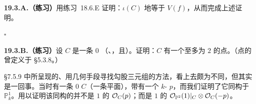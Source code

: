 \textbf{19.3.A.（练习）}\quad 用\mbox{练习~18.6.E} 证明：$\iota(C)$ \trSchemeTheoretic{}地等于 $V(f)$，从而完成上述证明。

\begin{flushright}
$\square$
\end{flushright}

\textbf{19.3.B.（练习）}\quad 设 $C$ 是一条\trGenus{} $0$ \trCurve（\trProjective、\trGeometricallyIntegral，且\trRegular）。证明：$C$ 有一个\trDegree{}至多为 $2$ 的点。（点的\trDegree{}曾定义于 \S5.3.8。）

\S7.5.9 中所呈现的、用几何手段寻找勾股三元组的方法，看上去颇为不同，但其实是一回事。当时有一条\trGenus{} $0$ \trCurve{} $C$（一条平面\trConic），带有一个 $k$-\trValuedPoint{} $p$，而我们证明了它同构于 $\mathbb{P}^1_k$。用以证明该同构的\trLineBundle{}并不是\trDegree{} $1$ 的\trLineBundle{} $\mathcal{O}_C(p)$；而是\trDegree{} $1$ 的\trLineBundle{} $\mathcal{O}_{\mathbb{P}^2}(1)|_C\otimes\mathcal{O}_C(-p)$。

